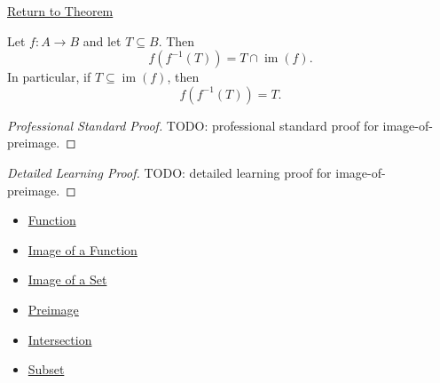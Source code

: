 \newpage
{}
\label{prf:image-of-preimage}

\begin{remark*}[Return]
\hyperref[thm:image-of-preimage]{Return to Theorem}
\end{remark*}

\begin{theorem*}
Let $f:A\to B$ and let $T\subseteq B$. Then
\[
f(f^{-1}(T)) = T\cap \operatorname{im}(f).
\]
In particular, if $T\subseteq \operatorname{im}(f)$, then
\[
f(f^{-1}(T))=T.
\]
\end{theorem*}

\begin{proof}[Professional Standard Proof]
\LRAProofBodyStart
TODO: professional standard proof for image-of-preimage.
\end{proof}

\begin{proof}[Detailed Learning Proof]
\LRAProofBodyStart
TODO: detailed learning proof for image-of-preimage.
\end{proof}

\begin{remark*}
\end{remark*}

\begin{dependencies}
\begin{itemize}
  \item \hyperref[def:function]{Function}
  \item \hyperref[def:image-function]{Image of a Function}
  \item \hyperref[def:image-set]{Image of a Set}
  \item \hyperref[def:preimage]{Preimage}
  \item \hyperref[def:intersection]{Intersection}
  \item \hyperref[def:subset]{Subset}
\end{itemize}
\end{dependencies}

\clearpage

